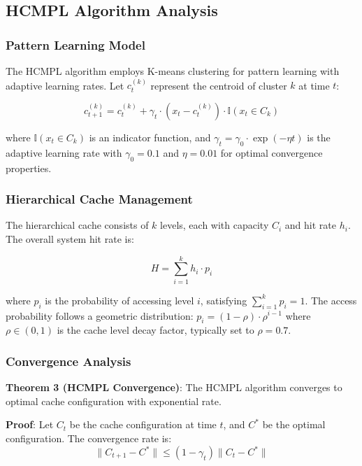 \documentclass[conference]{IEEEtran}
\begin{document}
\subsection{HCMPL Algorithm Analysis}

\subsubsection{Pattern Learning Model}

The HCMPL algorithm employs K-means clustering for pattern learning with adaptive learning rates. Let $c_t^{(k)}$ represent the centroid of cluster $k$ at time $t$:

\begin{equation}
c_{t+1}^{(k)} = c_t^{(k)} + \gamma_t \cdot (x_t - c_t^{(k)}) \cdot \mathbb{I}(x_t \in C_k)
\end{equation}

where $\mathbb{I}(x_t \in C_k)$ is an indicator function, and $\gamma_t = \gamma_0 \cdot \exp(-\eta t)$ is the adaptive learning rate with $\gamma_0 = 0.1$ and $\eta = 0.01$ for optimal convergence properties.

\subsubsection{Hierarchical Cache Management}

The hierarchical cache consists of $k$ levels, each with capacity $C_i$ and hit rate $h_i$. The overall system hit rate is:

\begin{equation}
H = \sum_{i=1}^{k} h_i \cdot p_i
\end{equation}

where $p_i$ is the probability of accessing level $i$, satisfying $\sum_{i=1}^{k} p_i = 1$. The access probability follows a geometric distribution: $p_i = (1-\rho) \cdot \rho^{i-1}$ where $\rho \in (0,1)$ is the cache level decay factor, typically set to $\rho = 0.7$.

\subsubsection{Convergence Analysis}

\textbf{Theorem 3 (HCMPL Convergence)}: The HCMPL algorithm converges to optimal cache configuration with exponential rate.

\textbf{Proof}: Let $C_t$ be the cache configuration at time $t$, and $C^*$ be the optimal configuration. The convergence rate is:
\begin{equation}
\|C_{t+1} - C^*\| \leq (1-\gamma_t)\|C_t - C^*\|
\end{equation}
\end{document}

